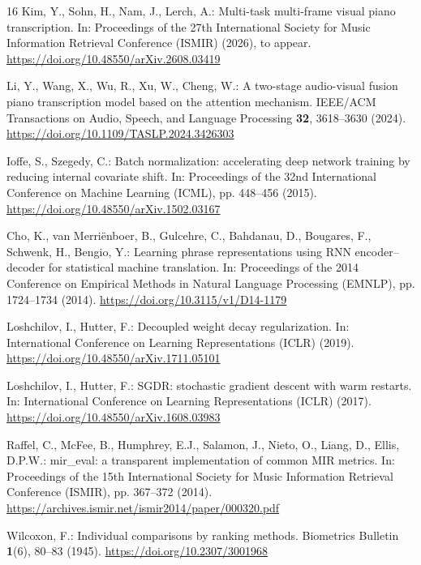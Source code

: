 \documentclass[pdflatex,sn-mathphys-num]{sn-jnl}
\begin{document}
\begin{thebibliography}{16}
Kim, Y., Sohn, H., Nam, J., Lerch, A.: Multi-task multi-frame visual piano transcription. In: Proceedings of the 27th International Society for Music Information Retrieval Conference (ISMIR) (2026), to appear. \url{https://doi.org/10.48550/arXiv.2608.03419}

Li, Y., Wang, X., Wu, R., Xu, W., Cheng, W.: A two-stage audio-visual fusion piano transcription model based on the attention mechanism. IEEE/ACM Transactions on Audio, Speech, and Language Processing \textbf{32}, 3618--3630 (2024). \url{https://doi.org/10.1109/TASLP.2024.3426303}

Ioffe, S., Szegedy, C.: Batch normalization: accelerating deep network training by reducing internal covariate shift. In: Proceedings of the 32nd International Conference on Machine Learning (ICML), pp. 448--456 (2015). \url{https://doi.org/10.48550/arXiv.1502.03167}

Cho, K., van Merri\"{e}nboer, B., Gulcehre, C., Bahdanau, D., Bougares, F., Schwenk, H., Bengio, Y.: Learning phrase representations using RNN encoder--decoder for statistical machine translation. In: Proceedings of the 2014 Conference on Empirical Methods in Natural Language Processing (EMNLP), pp. 1724--1734 (2014). \url{https://doi.org/10.3115/v1/D14-1179}

Loshchilov, I., Hutter, F.: Decoupled weight decay regularization. In: International Conference on Learning Representations (ICLR) (2019). \url{https://doi.org/10.48550/arXiv.1711.05101}

Loshchilov, I., Hutter, F.: SGDR: stochastic gradient descent with warm restarts. In: International Conference on Learning Representations (ICLR) (2017). \url{https://doi.org/10.48550/arXiv.1608.03983}

Raffel, C., McFee, B., Humphrey, E.J., Salamon, J., Nieto, O., Liang, D., Ellis, D.P.W.: mir\_eval: a transparent implementation of common MIR metrics. In: Proceedings of the 15th International Society for Music Information Retrieval Conference (ISMIR), pp. 367--372 (2014). \url{https://archives.ismir.net/ismir2014/paper/000320.pdf}

Wilcoxon, F.: Individual comparisons by ranking methods. Biometrics Bulletin \textbf{1}(6), 80--83 (1945). \url{https://doi.org/10.2307/3001968}

\end{thebibliography}
\end{document}
